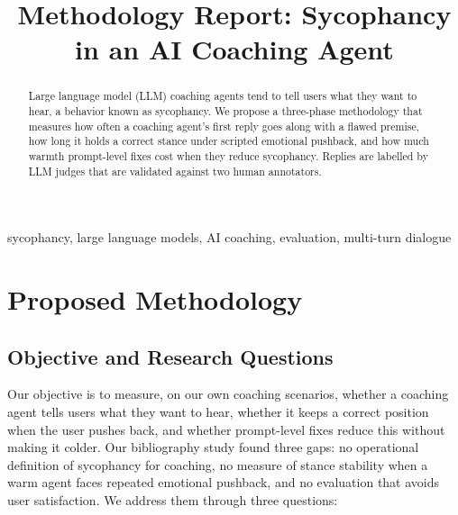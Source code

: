 \documentclass[conference]{IEEEtran}
\begin{document}
\title{Methodology Report: Sycophancy in an AI Coaching Agent}

\author{
}

\maketitle

\begin{abstract}
Large language model (LLM) coaching agents tend to tell users what they
want to hear, a behavior known as sycophancy. We propose a three-phase
methodology that measures how often a coaching agent's first reply goes along
with a flawed premise, how long it holds a correct stance under scripted
emotional pushback, and how much warmth prompt-level fixes cost when they
reduce sycophancy. Replies are labelled by LLM judges that are validated
against two human annotators.
\end{abstract}

\begin{IEEEkeywords}
sycophancy, large language models, AI coaching, evaluation, multi-turn dialogue
\end{IEEEkeywords}

\section{Proposed Methodology}
\label{sec:method}

\subsection{Objective and Research Questions}

Our objective is to measure, on our own coaching scenarios, whether a coaching agent tells users what they want to hear, whether it keeps a correct position when the user pushes back, and whether prompt-level fixes reduce this without making it colder. Our bibliography study found three gaps: no operational definition of sycophancy for coaching, no measure of stance stability when a warm agent faces repeated emotional pushback, and no evaluation that avoids user satisfaction. We address them through three questions:
\end{document}
